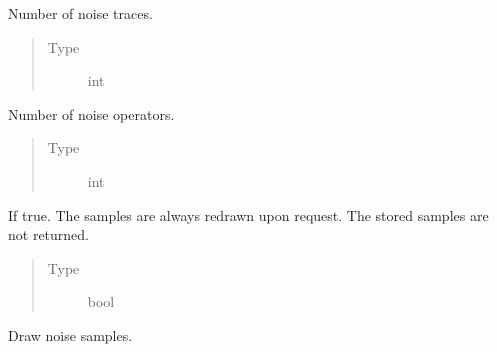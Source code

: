\documentclass[letterpaper,10pt,english]{sphinxmanual}
\begin{document}
\begin{fulllineitems}
\begin{fulllineitems}
\label{\detokenize{qsim:qsim.noise.NoiseTraceGenerator.n_traces}}
Number of noise traces.
\begin{quote}\begin{description}
\item[{Type}] \leavevmode
int

\end{description}\end{quote}

\end{fulllineitems}


\begin{fulllineitems}
\label{\detokenize{qsim:qsim.noise.NoiseTraceGenerator.n_noise_operators}}
Number of noise operators.
\begin{quote}\begin{description}
\item[{Type}] \leavevmode
int

\end{description}\end{quote}

\end{fulllineitems}


\begin{fulllineitems}
\label{\detokenize{qsim:qsim.noise.NoiseTraceGenerator.always_redraw_samples}}
If true. The samples are always redrawn upon request. The stored samples
are not returned.
\begin{quote}\begin{description}
\item[{Type}] \leavevmode
bool

\end{description}\end{quote}

\end{fulllineitems}



\begin{fulllineitems}
Draw noise samples.


\end{fulllineitems}
\end{fulllineitems}
\end{document}

